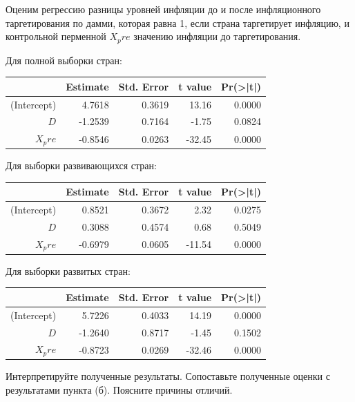 \documentclass[a4paper,12pt]{article} %
\begin{document}
Оценим регрессию разницы уровней инфляции до и после инфляционного таргетирования по дамми, которая равна 1, если страна таргетирует инфляцию, и контрольной перменной  $ X_pre $ значению инфляции до таргетирования.
 
Для полной выборки стран:
 
\begin{table}[h!]
	\centering
	\begin{tabular}{rrrrr}
		\hline
		& Estimate & Std. Error & t value & Pr(>|t|) \\ 
		\hline
		(Intercept) & 4.7618 & 0.3619 & 13.16 & 0.0000 \\ 
		$ D $ & -1.2539 & 0.7164 & -1.75 & 0.0824 \\ 
		$ X_pre $ & -0.8546 & 0.0263 & -32.45 & 0.0000 \\ 
		\hline
	\end{tabular}
\end{table}

Для выборки развивающихся стран:

\begin{table}[h!]
	\centering
	\begin{tabular}{rrrrr}
		\hline
		& Estimate & Std. Error & t value & Pr(>|t|) \\ 
		\hline
		(Intercept) & 0.8521 & 0.3672 & 2.32 & 0.0275 \\ 
		$ D $ & 0.3088 & 0.4574 & 0.68 & 0.5049 \\ 
		$ X_pre $ & -0.6979 & 0.0605 & -11.54 & 0.0000 \\ 
		\hline
	\end{tabular}
\end{table}

Для выборки развитых стран:

\begin{table}[h!]
	\centering
	\begin{tabular}{rrrrr}
		\hline
		& Estimate & Std. Error & t value & Pr(>|t|) \\ 
		\hline
		(Intercept) & 5.7226 & 0.4033 & 14.19 & 0.0000 \\ 
		$ D $ & -1.2640 & 0.8717 & -1.45 & 0.1502 \\ 
		$ X_pre $  & -0.8723 & 0.0269 & -32.46 & 0.0000 \\ 
		\hline
	\end{tabular}
\end{table}


Интерпретируйте полученные
результаты. Сопоставьте полученные оценки с результатами пункта (б).
Поясните причины отличий.
\end{document}
